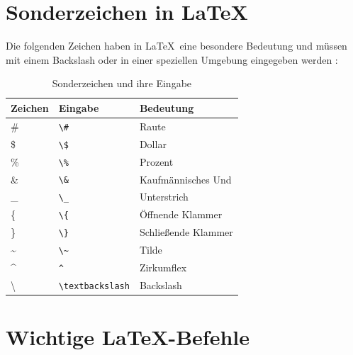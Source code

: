 
\chapter{Sonderzeichen in \LaTeX}
\label{anhang:sonderzeichen}

Die folgenden Zeichen haben in \LaTeX\ eine besondere Bedeutung und
müssen mit einem Backslash oder in einer speziellen Umgebung eingegeben werden \cite{lamport1994}:

\begin{table}[htbp]
    \centering
    \caption{Sonderzeichen und ihre Eingabe}
    \label{tab:sonderzeichen}
    \begin{tabular}{lll}
        \toprule
        Zeichen & Eingabe & Bedeutung \\
        \midrule
        \#  & \texttt{\textbackslash\#}  & Raute \\
        \$  & \texttt{\textbackslash\$}  & Dollar \\
        \%  & \texttt{\textbackslash\%}  & Prozent \\
        \&  & \texttt{\textbackslash\&}  & Kaufmännisches Und \\
        \_  & \texttt{\textbackslash\_}  & Unterstrich \\
        \{  & \texttt{\textbackslash\{}  & Öffnende Klammer \\
        \}  & \texttt{\textbackslash\}}  & Schließende Klammer \\
        \textasciitilde     & \texttt{\textbackslash\textasciitilde} & Tilde \\
        \textasciicircum     & \texttt{\textasciicircum}     & Zirkumflex \\
        \textbackslash      & \texttt{\textbackslash textbackslash} & Backslash \\
        \bottomrule
    \end{tabular}
\end{table}

\chapter{Wichtige \LaTeX-Befehle}
\label{anhang:befehle}

